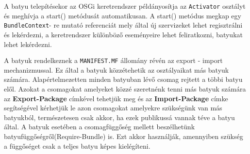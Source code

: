 A batyu telepítésekor az OSGi keretrendszer példányosítja az \texttt{Activator} osztályt és meghívja a start() metódusát automatikusan. A start() metódus megkap egy \texttt{BundleContext}- re mutató referenciát mely által új szervizeket lehet regisztrálni és lekérdezni, a keretrendszer különböző eseményeire lehet feliratkozni, batyukat lehet lekérdezni.

A batyuk rendelkeznek a \texttt{MANIFEST.MF} állomány révén az export - import mechanizmussal. Ez által a batyuk közzétehetik az osztályaikat más batyuk számára. Alapértelmezetten minden batyuban lévő csomag rejtett a többi batyu elől. Azokat a csomagokat amelyeket közzé szeretnénk tenni más batyuk számára az \textbf{Export-Package} címkével tehetjük meg és az \textbf{Import-Package} címke segítségével kérhetjük le azon csomagokat amelyekre szükségünk van más batyukból, természetesen csak akkor, ha ezek publikussá vannak téve a batyu által. A batyuk esetében a csomagfüggőség mellett beszélhetünk batyufüggőségről(Require-Bundle) is. Ezt akkor használják, amennyiben szükség a függőséget csak a teljes batyu képes kielégíteni.

